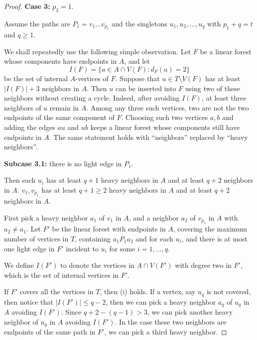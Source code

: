 \documentclass[10pt,a4paper]{amsart}
\begin{document}
\begin{proof}
    \noindent
    \textbf{Case 3:} $p_2 = 1$.
    
    Assume the paths are $P_1=v_1 \ldots v_{p_1}$ and the singletons $u_1, u_2,\ldots, u_q$ with $p_1 + q = t$ and $q\geq 1$.

    We shall repeatedly use the following simple observation. Let $F$ be a
linear forest whose components have endpoints in $A$, and let
$$
I(F)=\{a\in A\cap V(F): d_F(a)=2\}
$$
be the set of internal $A$-vertices of $F$. Suppose that
$u\in T\setminus V(F)$ has at least $|I(F)|+3$ neighbors in $A$.
Then $u$ can be inserted into $F$ using two of these neighbors without
creating a cycle. Indeed, after avoiding $I(F)$, at least three neighbors
of $u$ remain in $A$. Among any three such vertices, two are not the two
endpoints of the same component of $F$. Choosing such two vertices $a,b$
and adding the edges $au$ and $ub$ keeps a linear forest whose components
still have endpoints in $A$. The same statement holds with ``neighbors''
replaced by ``heavy neighbors''.

    \textbf{Subcase 3.1:} there is no light edge in $P_1$.
    
    Then each $u_i$ has at least $q+1$ heavy neighbors in $A$ and at least $q+2$ neighbors in $A$.
    $v_1, v_{p_1}$ has at least $q+1\geq 2$ heavy neighbors in $A$ and at least $q+2$ neighbors in $A$.

    First pick a heavy neighbor $a_1$ of $v_1$ in $A$, and a neighbor $a_2$ of $v_{p_1}$ in $A$ with $a_2 \neq a_1$.
    Let $F'$ be the linear forest with endpoints in $A$, covering the maximum number of vertices in $T$, containing $a_1P_1a_2$ and for each $u_i$, and there is at most one light edge in $F'$ incident to $u_i$ for some $i=1,\dots,q$.
    
    We define $I(F')$ to denote the vertices in $A\cap V(F')$ with degree two in $F'$, which is the set of internal vertices in $F'$.

    
    If $F'$ covers all the vertices in $T$, then (i) holds.
    If a vertex, say $u_q$ is not covered, then notice that $|I(F')|\leq q-2$, then we can pick a heavy neighbor $a_q$ of $u_q$ in $A$ avoiding $I(F')$.
    Since $q+2-(q-1) > 3$, we can pick another heavy neighbor of $u_q$ in $A$ avoiding $I(F')$. In the case these two neighbors are endpoints of the same path in $F'$, we can pick a third heavy neighbor. 



\end{proof}
\end{document}
